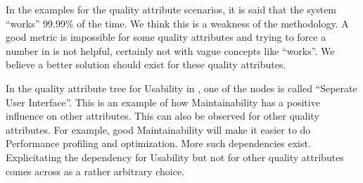 \documentclass[a4paper,11pt]{report}
\begin{document}
In the examples for the quality attribute scenarios, it is said that the system ``works'' 99.99\% of the time. We think this is a weakness of the methodology. A good metric is impossible for some quality attributes and trying to force a number in is not helpful, certainly not with vague concepts like ``works''. We believe a better solution should exist for these quality attributes.

In the quality attribute tree for Usability in \cite{citeulike:174301}, one of the nodes is called ``Seperate User Interface''. This is an example of how Maintainability has a positive influence on other attributes. This can also be observed for other quality attributes. For example, good Maintainability will make it easier to do Performance profiling and optimization. More such dependencies exist. Explicitating the dependency for Usability but not for other quality attributes comes across as a rather arbitrary choice.

\nocite{1202957}
\nocite{citeulike:174301}
\nocite{yskout}
\nocite{Avgeriou2005}
\nocite{citeulike:171548}


\end{document}
